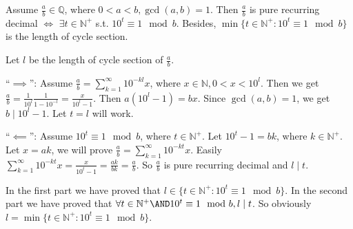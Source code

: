 \documentclass{ctexart}
\begin{document}
\begin{problem}\label{pro:45.4}
  Assume \(\frac{a}{b} \in \mathbb{Q}\), where \(0<a<b, \gcd(a,b)=1\). Then \(\frac{a}{b}\) is pure recurring decimal \(\iff\)
  \(\exists t \in \mathbb{N}^+\) s.t. \(10^t \equiv 1\mod b\).
  Besides, \(\min\{t \in \mathbb{N}^+: 10^t \equiv 1\mod b\}\) is the length of cycle section.
\end{problem}
\begin{solution}
  Let \(l\) be the length of cycle section of \(\frac{a}{b}\).

  ``\(\implies\)'': Assume \(\frac{a}{b}=\sum_{k=1}^{\infty} 10^{-kl} x\), where \(x \in \mathbb{N},0 < x <10^l\).
  Then we get \(\frac{a}{b}=\frac{1}{10^l} \frac{1}{1-10^{-l}}=\frac{x}{10^l-1}\).
  Then \(a(10^l-1)=bx\). Since \(\gcd(a,b)=1\), we get \(b \mid 10^l-1\). Let \(t=l\) will work.

  ``\(\impliedby\)'': Assume \(10^t \equiv 1 \mod b\), where \(t \in \mathbb{N}^+\).
  Let \(10^t-1=bk\), where \(k \in \mathbb{N}^+\). Let \(x=ak\), we will prove \(\frac{a}{b}=\sum_{k=1}^{\infty} 10^{-kt} x\).
  Easily \(\sum_{k=1}^{\infty} 10^{-kt}x = \frac{x}{10^t-1}=\frac{ak}{bk}=\frac{a}{b}\).
  So \(\frac{a}{b}\) is pure recurring decimal and \(l \mid t\).

  In the first part we have proved that \(l \in \{t \in \mathbb{N}^+:10^t \equiv 1 \mod b\}\).
  In the second part we have proved that \(\forall t \in \mathbb{N}^+ \AND 10^t \equiv 1 \mod b, l \mid t\).
  So obviously \(l=\min\{t \in \mathbb{N}^+:10^t \equiv 1 \mod b\}\).
\end{solution}
\end{document}
